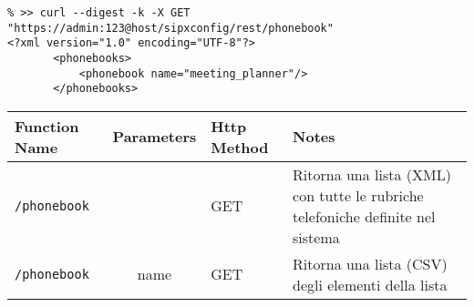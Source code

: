 \begin{lstlisting}
% >> curl --digest -k -X GET "https://admin:123@host/sipxconfig/rest/phonebook"
<?xml version="1.0" encoding="UTF-8"?>
       <phonebooks>
           <phonebook name="meeting_planner"/>
       </phonebooks>
\end{lstlisting}


\bigskip

\begin{tabular}[c]{l | c || l || p{5cm}}
Function Name & Parameters & Http Method & Notes \\
\hline \hline
\texttt{/phonebook} & & GET & Ritorna una lista (XML) con tutte le rubriche telefoniche definite nel sistema \\
\hline 
\texttt{/phonebook} & {name} & GET  & Ritorna una lista (CSV) degli elementi della lista \\
\hline
\end{tabular}

